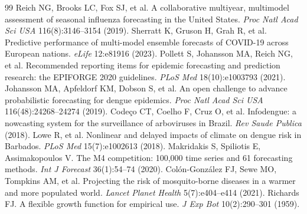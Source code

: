 \documentclass[11pt]{article}
\begin{document}
\begin{thebibliography}{99}
 Reich NG, Brooks LC, Fox SJ, et al. A collaborative multiyear, multimodel assessment of seasonal influenza forecasting in the United States. \emph{Proc Natl Acad Sci USA} 116(8):3146--3154 (2019).
 Sherratt K, Gruson H, Grah R, et al. Predictive performance of multi-model ensemble forecasts of COVID-19 across European nations. \emph{eLife} 12:e81916 (2023).
 Pollett S, Johansson MA, Reich NG, et al. Recommended reporting items for epidemic forecasting and prediction research: the EPIFORGE 2020 guidelines. \emph{PLoS Med} 18(10):e1003793 (2021).
 Johansson MA, Apfeldorf KM, Dobson S, et al. An open challenge to advance probabilistic forecasting for dengue epidemics. \emph{Proc Natl Acad Sci USA} 116(48):24268--24274 (2019).
 Codeço CT, Coelho F, Cruz O, et al. Infodengue: a nowcasting system for the surveillance of arboviruses in Brazil. \emph{Rev Saude Publica} (2018).
 Lowe R, et al. Nonlinear and delayed impacts of climate on dengue risk in Barbados. \emph{PLoS Med} 15(7):e1002613 (2018).
 Makridakis S, Spiliotis E, Assimakopoulos V. The M4 competition: 100,000 time series and 61 forecasting methods. \emph{Int J Forecast} 36(1):54--74 (2020).
 Col\'on-Gonz\'alez FJ, Sewe MO, Tompkins AM, et al. Projecting the risk of mosquito-borne diseases in a warmer and more populated world. \emph{Lancet Planet Health} 5(7):e404--e414 (2021).
 Richards FJ. A flexible growth function for empirical use. \emph{J Exp Bot} 10(2):290--301 (1959).
\end{thebibliography}
\end{document}
